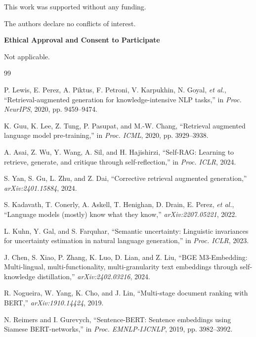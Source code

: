\documentclass[twocolumn]{ICCKjournal}
\begin{document}
\acknowledgement
This work was supported without any funding.

\conflictsofinterest
The authors declare no conflicts of interest.

\vspace{10pt}

{\large\textbf{Ethical Approval and Consent to Participate}}

Not applicable.

\begin{fullwidth}
\begin{thebibliography}{99}

P. Lewis, E. Perez, A. Piktus, F. Petroni, V. Karpukhin, N. Goyal, \textit{et al.}, ``Retrieval-augmented generation for knowledge-intensive NLP tasks,'' in \textit{Proc. NeurIPS}, 2020, pp. 9459--9474.

K. Guu, K. Lee, Z. Tung, P. Pasupat, and M.-W. Chang, ``Retrieval augmented language model pre-training,'' in \textit{Proc. ICML}, 2020, pp. 3929--3938.

A. Asai, Z. Wu, Y. Wang, A. Sil, and H. Hajishirzi, ``Self-RAG: Learning to retrieve, generate, and critique through self-reflection,'' in \textit{Proc. ICLR}, 2024.

S. Yan, S. Gu, L. Zhu, and Z. Dai, ``Corrective retrieval augmented generation,'' \textit{arXiv:2401.15884}, 2024.

S. Kadavath, T. Conerly, A. Askell, T. Henighan, D. Drain, E. Perez, \textit{et al.}, ``Language models (mostly) know what they know,'' \textit{arXiv:2207.05221}, 2022.

L. Kuhn, Y. Gal, and S. Farquhar, ``Semantic uncertainty: Linguistic invariances for uncertainty estimation in natural language generation,'' in \textit{Proc. ICLR}, 2023.

J. Chen, S. Xiao, P. Zhang, K. Luo, D. Lian, and Z. Liu, ``BGE M3-Embedding: Multi-lingual, multi-functionality, multi-granularity text embeddings through self-knowledge distillation,'' \textit{arXiv:2402.03216}, 2024.

R. Nogueira, W. Yang, K. Cho, and J. Lin, ``Multi-stage document ranking with BERT,'' \textit{arXiv:1910.14424}, 2019.

N. Reimers and I. Gurevych, ``Sentence-BERT: Sentence embeddings using Siamese BERT-networks,'' in \textit{Proc. EMNLP-IJCNLP}, 2019, pp. 3982--3992.


\end{thebibliography}
\end{fullwidth}
\end{document}
